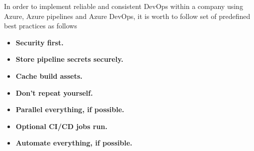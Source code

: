 In order to implement reliable and consistent DevOps within a company using Azure, Azure pipelines and Azure DevOps,
it is worth to follow set of predefined best practices as follows
\begin{itemize}
    \item \textbf{Security first.}
    \item \textbf{Store pipeline secrets securely.}
    \item \textbf{Cache build assets.}
    \item \textbf{Don't repeat yourself.}
    \item \textbf{Parallel everything, if possible.}
    \item \textbf{Optional CI/CD jobs run.}
    \item \textbf{Automate everything, if possible.}
\end{itemize}